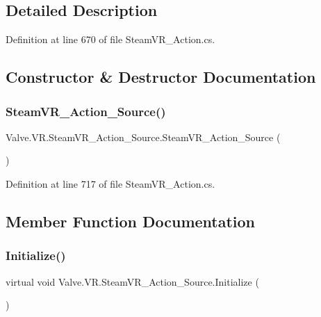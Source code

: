 \subsection{Detailed Description}


Definition at line 670 of file Steam\+V\+R\+\_\+\+Action.\+cs.



\subsection{Constructor \& Destructor Documentation}
\mbox{\label{class_valve_1_1_v_r_1_1_steam_v_r___action___source_afe35f80548857d2da588f8a0c036e3e3}} 
\subsubsection{\texorpdfstring{SteamVR\_Action\_Source()}{SteamVR\_Action\_Source()}}
{\footnotesize\ttfamily Valve.\+V\+R.\+Steam\+V\+R\+\_\+\+Action\+\_\+\+Source.\+Steam\+V\+R\+\_\+\+Action\+\_\+\+Source (\begin{DoxyParamCaption}{ }\end{DoxyParamCaption})}



Definition at line 717 of file Steam\+V\+R\+\_\+\+Action.\+cs.



\subsection{Member Function Documentation}
\mbox{\label{class_valve_1_1_v_r_1_1_steam_v_r___action___source_aa4784c092cc0a4372812834bfcceab6d}} 
\subsubsection{\texorpdfstring{Initialize()}{Initialize()}}
{\footnotesize\ttfamily virtual void Valve.\+V\+R.\+Steam\+V\+R\+\_\+\+Action\+\_\+\+Source.\+Initialize (\begin{DoxyParamCaption}{ }\end{DoxyParamCaption})\hspace{0.3cm}{\ttfamily [virtual]}}



